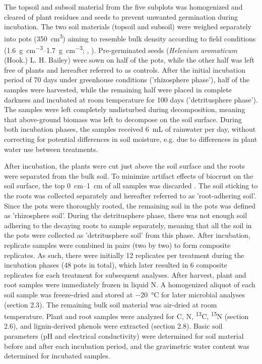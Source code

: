 The topsoil and subsoil material from the five subplots was homogenized and cleared of plant residues and seeds to prevent unwanted germination during incubation. The two soil materials (topsoil and subsoil) were weighed separately into pots (\SI{350}{\centi\metre\cubed}) aiming to resemble bulk density according to field conditions (\SIrange{1.6}{1.7}{\gram\per\centi\metre\cubed}; \citeauthor{Bernhard2018}, \citeyear{Bernhard2018}). Pre-germinated seeds (\textit{Helenium aromaticum} (Hook.) L. H. Bailey) were sown on half of the pots, while the other half was left free of plants and hereafter referred to as controls. After the initial incubation period of 70 days under greenhouse conditions ('rhizosphere phase'), half of the samples were harvested, while the remaining half were placed in complete darkness and incubated at room temperature for 100 days ('detritusphere phase'). The samples were left completely undisturbed during decomposition, meaning that above-ground biomass was left to decompose on the soil surface. During both incubation phases, the samples received \SI{6}{\milli\liter} of rainwater per day, without correcting for potential differences in soil moisture, e.g. due to differences in plant water use between treatments.

After incubation, the plants were cut just above the soil surface and the roots were separated from the bulk soil. To minimize artifact effects of biocrust on the soil surface, the top \SIrange{0}{1}{\centi\metre} of all samples was discarded \citep{Weber2022}. The soil sticking to the roots was collected separately and hereafter referred to as 'root-adhering soil'. Since the pots were thoroughly rooted, the remaining soil in the pots was defined as 'rhizosphere soil'. During the detritusphere phase, there was not enough soil adhering to the decaying roots to sample separately, meaning that all the soil in the pots were collected as 'detritusphere soil' from this phase. After incubation, replicate samples were combined in pairs (two by two) to form composite replicates. As such, there were initially 12 replicates per treatment during the incubation phases (48 pots in total), which later resulted in 6 composite replicates for each treatment for subsequent analyses. After harvest, plant and root samples were immediately frozen in liquid N. A homogenized aliquot of each soil sample was freeze-dried and stored at \SI{-20}{\degreeCelsius} for later microbial analyses (section 2.3). The remaining bulk soil material was air-dried at room temperature. Plant and root samples were analyzed for C, N, \textsuperscript{13}C, \textsuperscript{15}N (section 2.6), and lignin-derived phenols were extracted (section 2.8). Basic soil parameters (pH and electrical conductivity) were determined for soil material before and after each incubation period, and the gravimetric water content was determined for incubated samples.

